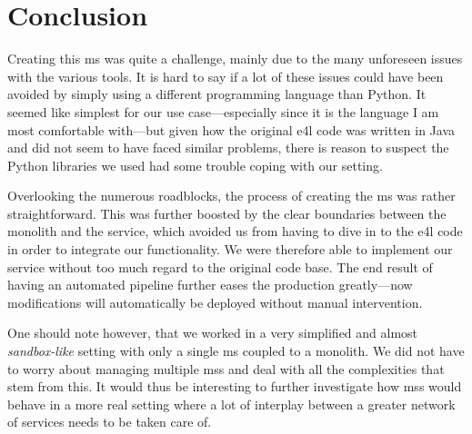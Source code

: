 \section{Conclusion}

Creating this \gls{ms} was quite a challenge, mainly due to the many
unforeseen issues with the various tools. It is hard to say if a lot
of these issues could have been avoided by simply using a different
programming language than Python. It seemed like simplest for our use
case---especially since it is the language I am most comfortable
with---but given how the original \gls{e4l} code was written in Java
and did not seem to have faced similar problems, there is reason to
suspect the Python libraries we used had some trouble coping with our
setting.

Overlooking the numerous roadblocks, the process of creating the
\gls{ms} was rather straightforward. This was further boosted by the
clear boundaries between the monolith and the service, which avoided
us from having to dive in to the \gls{e4l} code in order to integrate
our functionality. We were therefore able to implement our service
without too much regard to the original code base. The end result of
having an automated pipeline further eases the production greatly---now
modifications will automatically be deployed without manual
intervention.

One should note however, that we worked in a very simplified and
almost \emph{sandbox-like} setting with only a single \gls{ms} coupled to
a monolith. We did not have to worry about managing multiple
\glspl{ms} and deal with all the complexities that stem from this. It
would thus be interesting to further investigate how \glspl{ms} would
behave in a more real setting where a lot of interplay between a
greater network of services needs to be taken care of.

